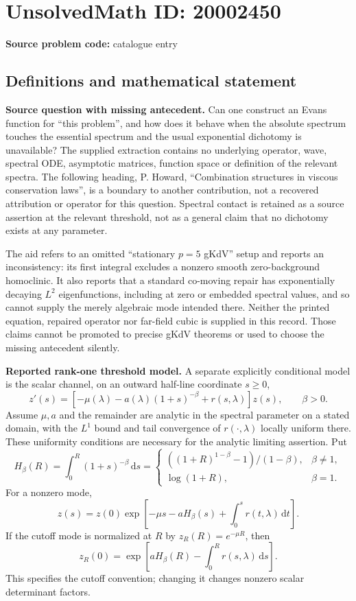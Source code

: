 \documentclass[11pt]{article}
\begin{document}
\section*{UnsolvedMath ID: 20002450}
\textbf{Source problem code:} catalogue entry
\subsection{Definitions and mathematical statement}
\textbf{Source question with missing antecedent.} Can one construct an Evans function for ``this problem'', and how does it behave when the absolute spectrum touches the essential spectrum and the usual exponential dichotomy is unavailable? The supplied extraction contains no underlying operator, wave, spectral ODE, asymptotic matrices, function space or definition of the relevant spectra. The following heading, P. Howard, ``Combination structures in viscous conservation laws'', is a boundary to another contribution, not a recovered attribution or operator for this question. Spectral contact is retained as a source assertion at the relevant threshold, not as a general claim that no dichotomy exists at any parameter.

The aid refers to an omitted ``stationary \(p=5\) gKdV'' setup and reports an inconsistency: its first integral excludes a nonzero smooth zero-background homoclinic. It also reports that a standard co-moving repair has exponentially decaying \(L^2\) eigenfunctions, including at zero or embedded spectral values, and so cannot supply the merely algebraic mode intended there. Neither the printed equation, repaired operator nor far-field cubic is supplied in this record. Those claims cannot be promoted to precise gKdV theorems or used to choose the missing antecedent silently.

\textbf{Reported rank-one threshold model.} A separate explicitly conditional model is the scalar channel, on an outward half-line coordinate \(s\geq0\),
\[
 z'(s)=\left[-\mu(\lambda)-a(\lambda)(1+s)^{-\beta}
                   +r(s,\lambda)\right]z(s),\qquad \beta>0.
\]
Assume \(\mu,a\) and the remainder are analytic in the spectral parameter on a stated domain, with the \(L^1\) bound and tail convergence of \(r(\cdot,\lambda)\) locally uniform there. These uniformity conditions are necessary for the analytic limiting assertion. Put
\[
 H_\beta(R)=\int_0^R(1+s)^{-\beta}\,\mathrm ds
 =\begin{cases}((1+R)^{1-\beta}-1)/(1-\beta),&\beta\ne1,\\
 \log(1+R),&\beta=1.\end{cases}
\]
For a nonzero mode,
\[
 z(s)=z(0)\exp\left[-\mu s-aH_\beta(s)+\int_0^s r(t,\lambda)\,\mathrm dt\right].
\]
If the cutoff mode is normalized at \(R\) by \(z_R(R)=e^{-\mu R}\), then
\[
 z_R(0)=\exp\left[aH_\beta(R)-\int_0^Rr(s,\lambda)\,\mathrm ds\right].
\]
This specifies the cutoff convention; changing it changes nonzero scalar determinant factors.
\end{document}
